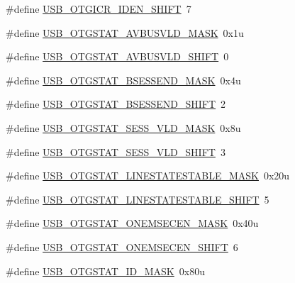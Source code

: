 \begin{DoxyCompactItemize}
\#define \hyperlink{group___u_s_b___register___masks_ga36d7ef200033a393e023ab06808f7129}{U\+S\+B\+\_\+\+O\+T\+G\+I\+C\+R\+\_\+\+I\+D\+E\+N\+\_\+\+S\+H\+I\+FT}~7
\item 
\#define \hyperlink{group___u_s_b___register___masks_gaad4e0319a6f42042472b52c8d1ec1c77}{U\+S\+B\+\_\+\+O\+T\+G\+S\+T\+A\+T\+\_\+\+A\+V\+B\+U\+S\+V\+L\+D\+\_\+\+M\+A\+SK}~0x1u
\item 
\#define \hyperlink{group___u_s_b___register___masks_ga66258b09ad8ec5462b8594ce5ac7384c}{U\+S\+B\+\_\+\+O\+T\+G\+S\+T\+A\+T\+\_\+\+A\+V\+B\+U\+S\+V\+L\+D\+\_\+\+S\+H\+I\+FT}~0
\item 
\#define \hyperlink{group___u_s_b___register___masks_gabcc7c3e58301a6abc07915a5deb92d39}{U\+S\+B\+\_\+\+O\+T\+G\+S\+T\+A\+T\+\_\+\+B\+S\+E\+S\+S\+E\+N\+D\+\_\+\+M\+A\+SK}~0x4u
\item 
\#define \hyperlink{group___u_s_b___register___masks_ga6eb987e49a137057c02e8f2b26e61724}{U\+S\+B\+\_\+\+O\+T\+G\+S\+T\+A\+T\+\_\+\+B\+S\+E\+S\+S\+E\+N\+D\+\_\+\+S\+H\+I\+FT}~2
\item 
\#define \hyperlink{group___u_s_b___register___masks_ga9158e279053f0f684c33cba2ec1e68ee}{U\+S\+B\+\_\+\+O\+T\+G\+S\+T\+A\+T\+\_\+\+S\+E\+S\+S\+\_\+\+V\+L\+D\+\_\+\+M\+A\+SK}~0x8u
\item 
\#define \hyperlink{group___u_s_b___register___masks_ga69ae55ac7a03104ed013c34efa24ef43}{U\+S\+B\+\_\+\+O\+T\+G\+S\+T\+A\+T\+\_\+\+S\+E\+S\+S\+\_\+\+V\+L\+D\+\_\+\+S\+H\+I\+FT}~3
\item 
\#define \hyperlink{group___u_s_b___register___masks_ga217f22f350652ae8ad2502c2baf8440b}{U\+S\+B\+\_\+\+O\+T\+G\+S\+T\+A\+T\+\_\+\+L\+I\+N\+E\+S\+T\+A\+T\+E\+S\+T\+A\+B\+L\+E\+\_\+\+M\+A\+SK}~0x20u
\item 
\#define \hyperlink{group___u_s_b___register___masks_ga34e5a04fe2a6546a9b22a40dc1f7c543}{U\+S\+B\+\_\+\+O\+T\+G\+S\+T\+A\+T\+\_\+\+L\+I\+N\+E\+S\+T\+A\+T\+E\+S\+T\+A\+B\+L\+E\+\_\+\+S\+H\+I\+FT}~5
\item 
\#define \hyperlink{group___u_s_b___register___masks_gaf29778bce4dce2841774778e5c566bf5}{U\+S\+B\+\_\+\+O\+T\+G\+S\+T\+A\+T\+\_\+\+O\+N\+E\+M\+S\+E\+C\+E\+N\+\_\+\+M\+A\+SK}~0x40u
\item 
\#define \hyperlink{group___u_s_b___register___masks_gaac9cb5de36e29af8366533e2c05c31ac}{U\+S\+B\+\_\+\+O\+T\+G\+S\+T\+A\+T\+\_\+\+O\+N\+E\+M\+S\+E\+C\+E\+N\+\_\+\+S\+H\+I\+FT}~6
\item 
\#define \hyperlink{group___u_s_b___register___masks_gab1f78fae0de86d5ced423f41f9d6b098}{U\+S\+B\+\_\+\+O\+T\+G\+S\+T\+A\+T\+\_\+\+I\+D\+\_\+\+M\+A\+SK}~0x80u

\end{DoxyCompactItemize}
